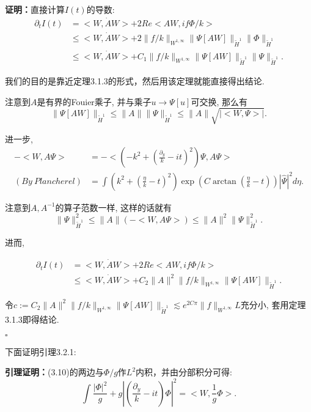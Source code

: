 \textbf{证明：}直接计算$I(t)$的导数:
\begin{equation}
\begin{aligned}
\partial_t I(t)&=<W,\dot{A}W>+2Re<AW, if\Phi/k>  \\
&\leq <W, \dot{A}W>+2\|f/k\|_{W^{1,\infty}}\|\Psi[AW]\|_{\tilde{H}^1}\|\Phi\|_{\tilde{H}^1} \\
&\leq <W, \dot{A}W>+C_1\|f/k\|_{W^{1,\infty}}\|\Psi[AW]\|_{\tilde{H}^1}\|\Psi\|_{\tilde{H}^1}.
\end{aligned}
\end{equation}

我们的目的是靠近定理3.1.3的形式，然后用该定理就能直接得出结论.

注意到$A$是有界的Fouier乘子, 并与乘子$u\rightarrow \Psi[u]$可交换, 那么有
\begin{equation}
\|\Psi[AW]\|_{\tilde{H}^1}\leq \|A\|\|\Psi\|_{\tilde{H}^1}\leq \|A\|\sqrt{|<W,\Psi>|}.
\end{equation}

进一步,
\begin{equation}
\begin{aligned}
-<W,A\Psi>&=-<(-k^2+(\frac{\partial_y}{k}-it)^2)\Psi,A\Psi> \\
(By~Plancherel)&=\int(k^2+(\frac{\eta}{k}-t)^2)\exp(C\arctan(\frac{\eta}{k}-t))|\hat{\Psi}|^2d\eta.
\end{aligned}
\end{equation}

注意到$A,A^{-1}$的算子范数一样, 这样的话就有
$$\|\Psi\|_{\tilde{H}^1}^2\leq \|A\|(-<W,A\Psi>)\leq \|A\|^2\|\Psi\|_{\tilde{H}^1}^2.$$

进而,

\begin{equation}
\begin{aligned}
\partial_t I(t)&=<W,\dot{A}W>+2Re<AW, if\Phi/k>  \\
&\leq <W, \dot{A}W>+C_2\|A\|^2\|f/k\|_{W^{1,\infty}}\|\Psi[AW]\|_{\tilde{H}^1}.
\end{aligned}
\end{equation}

令$c:=C_2\|A\|^2\|f/k\|_{W^{1,\infty}}\|\Psi[AW]\|_{\tilde{H}^1}\lesssim e^{2C\pi}\|f\|_{W^{1,\infty}}L$充分小, 套用定理3.1.3即得结论.
\begin{flushright}
$\square$
\end{flushright}

下面证明引理3.2.1:

\textbf{引理证明：}(3.10)的两边与$\Phi/g$作$L^2$内积，并由分部积分可得:
\begin{equation}
\int\frac{|\Phi|^2}{g}+g|(\frac{\partial_y}{k}-it)\Phi|^2 =<W,\frac{1}{g}\Phi>.
\end{equation}

